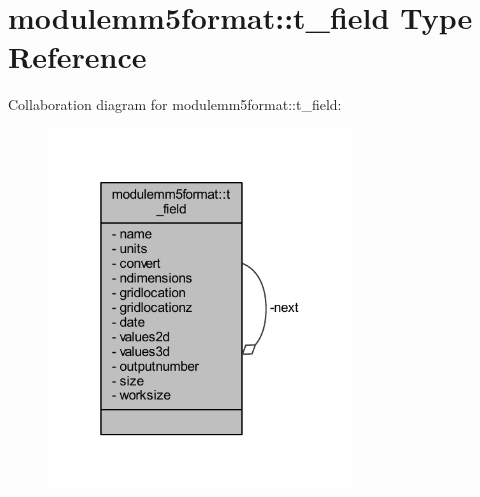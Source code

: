 \hypertarget{structmodulemm5format_1_1t__field}{}\section{modulemm5format\+:\+:t\+\_\+field Type Reference}
\label{structmodulemm5format_1_1t__field}


Collaboration diagram for modulemm5format\+:\+:t\+\_\+field\+:\nopagebreak
\begin{figure}[H]
\begin{center}
\leavevmode
\includegraphics[width=229pt]{structmodulemm5format_1_1t__field__coll__graph}
\end{center}
\end{figure}
